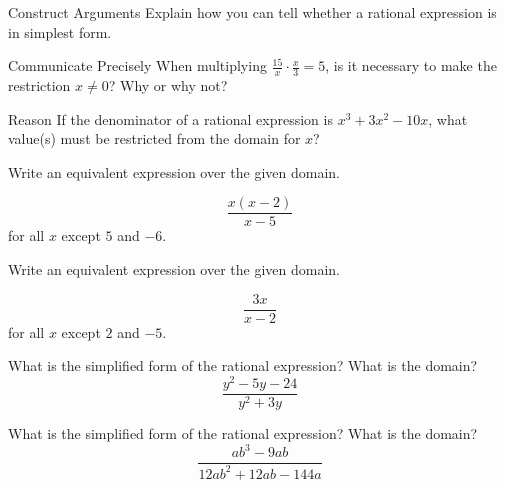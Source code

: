 \documentclass{article}
\newenvironment{practice}[2]{}{}        %
\newcommand{\answer}[1]{}               %
\begin{document}
\begin{practice}{17}{2}
Construct Arguments Explain how you can tell whether a rational expression is in simplest form.

\answer{A rational expression is in simplest form when the numerator and denominator have no common factors other than 1.}
\end{practice}

\begin{practice}{18}{2}
Communicate Precisely When multiplying $\frac{15}{x}\cdot\frac{x}{3}=5$, is it necessary to make the restriction $x\neq0$? Why or why not?

\answer{Yes; even though the factor of $x$ was canceled out, the original fractions cannot be undefined, so the restriction is necessary.}
\end{practice}

\begin{practice}{19}{2}
Reason If the denominator of a rational expression is $x^3+3x^2-10x$, what value(s) must be restricted from the domain for $x$?

\answer{$-5$, $0$, $2$}
\end{practice}

\begin{practice}{20}{1}
Write an equivalent expression over the given domain.

\[
\frac{x(x-2)}{x-5}
\]
for all $x$ except $5$ and $-6$.

\answer{$\frac{x^3+4x^2-12x}{x^2+x-30}$}
\end{practice}

\begin{practice}{21}{1}
Write an equivalent expression over the given domain.

\[
\frac{3x}{x-2}
\]
for all $x$ except $2$ and $-5$.

\answer{$\frac{3x^2+15x}{x^2+3x-10}$}
\end{practice}

\begin{practice}{22}{1}
What is the simplified form of the rational expression? What is the domain?
\[
\frac{y^2-5y-24}{y^2+3y}
\]

\answer{$\frac{y-8}{y}$ for all $y$ except $0$ and $-3$.}
\end{practice}

\begin{practice}{23}{1}
What is the simplified form of the rational expression? What is the domain?
\[
\frac{ab^3-9ab}{12ab^2+12ab-144a}
\]

\answer{$\frac{b(b+3)}{12(b+4)}$ for all real numbers except $a=0$, $b=-4$, and $b=3$.}
\end{practice}
\end{document}
